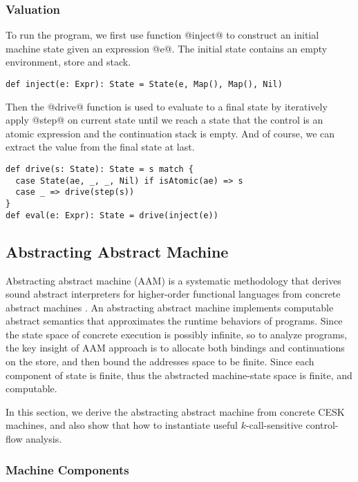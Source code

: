 \documentclass[acmsmall,review,anonymous]{acmart}\settopmatter{printfolios=true,printccs=false,printacmref=false}
\begin{document}
\subsubsection{Valuation}

To run the program, we first use function @inject@ to construct an initial machine
state given an expression @e@. The initial state contains an empty environment, 
store and stack.
\begin{lstlisting}
def inject(e: Expr): State = State(e, Map(), Map(), Nil)
\end{lstlisting}

Then the @drive@ function is used to evaluate
to a final state by iteratively apply @step@ on current state until we reach a state
that the control is an atomic expression and the continuation stack is empty.
And of course, we can extract the value from the final state at last.

\begin{lstlisting}
def drive(s: State): State = s match {
  case State(ae, _, _, Nil) if isAtomic(ae) => s
  case _ => drive(step(s))
}
def eval(e: Expr): State = drive(inject(e))
\end{lstlisting}

\subsection{Abstracting Abstract Machine} \label{aam}
Abstracting abstract machine (AAM) is a systematic methodology that derives sound 
abstract interpreters for higher-order functional languages from concrete 
abstract machines \cite{van2012systematic, van2010abstracting}. 
An abstracting abstract machine implements computable abstract semantics that 
approximates the runtime behaviors of programs.
Since the state space of concrete execution is possibly infinite,
so to analyze programs, the key insight of AAM approach is to allocate both bindings
and continuations on the store, and then bound the addresses space to be finite.
Since each component of state is finite, 
thus the abstracted machine-state space is finite, and computable.

In this section, we derive the abstracting abstract machine from concrete
CESK machines, and also show that how to instantiate
useful $k$-call-sensitive control-flow analysis.

\subsubsection{Machine Components}
\end{document}
